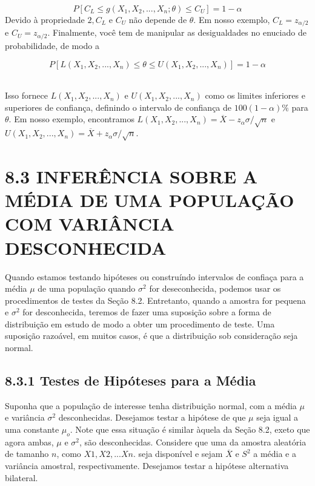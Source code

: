 \documentclass[a4paper,12pt]{article} %
\begin{document}
	\begin{equation*}
		P[C_L \leq g(X_1, X_2, ..., X_n; \theta) \leq C_U] = 1 - \alpha
	\end{equation*}
	Devido à propriedade $2, C_L$ e $C_U$ não depende de $\theta$. Em nosso exemplo, $C_L = z_{\alpha/2}$ e $C_U = z_{\alpha/2}$. Finalmente, você tem de manipular as desigualdades no enuciado de probabilidade, de modo a 
	
	\begin{equation*}
		P[L(X_1, X_2, ..., X_n) \leq \theta \leq U(X_1, X_2, ..., X_n)] = 1 - \alpha
	\end{equation*} \
	
	Isso fornece $L(X_1, X_2, ..., X_n)$ e $U(X_1, X_2, ..., X_n)$ como os limites inferiores e superiores de confiança, definindo o intervalo de confiança de $100(1-\alpha)\%$ para $\theta$. Em nosso exemplo, encontramos $L(X_1, X_2, ..., X_n)= \overline{X} -z_{\alpha}{\sigma} /\sqrt{n}$ e $U(X_1, X_2, ..., X_n)= \overline{X} +z_{\alpha}{\sigma} /\sqrt{n}$.
	
	\newpage
	\section*{8.3 INFERÊNCIA SOBRE A MÉDIA DE UMA POPULAÇÃO COM VARIÂNCIA DESCONHECIDA}
	
	Quando estamos testando hipóteses ou construíndo intervalos de confiaça para a média $\mu$ de uma população quando $\sigma^2$ for deseconhecida, podemos usar os procedimentos de testes da Seção 8.2. Entretanto, quando a amostra for pequena e $\sigma^2$ for desconhecida, teremos de fazer uma suposição sobre a forma de distribuição em estudo de modo a obter um procedimento de teste. Uma suposição razoável, em muitos casos, é que a distribuição sob consideração seja normal.
	
	\subsection*{8.3.1 Testes de Hipóteses para a Média}
	
	Suponha que a população de interesse tenha distribuição normal, com a média $\mu$ e variância $\sigma^2$ desconhecidas. Desejamos testar a hipótese de que $\mu$ seja igual a uma constante $\mu_o$. Note que essa situação é similar àquela da Seção 8.2, exeto que agora ambas, $\mu$ e $\sigma^2$, são desconhecidas. Considere que uma da amostra aleatória de tamanho $n$, como $X1, X2, ... Xn$. seja disponível e sejam $\overline{X}$ e $S^2$ a média e a variância amostral, respectivamente. 
	Desejamos testar a hipótese alternativa bilateral.
	
\end{document}
